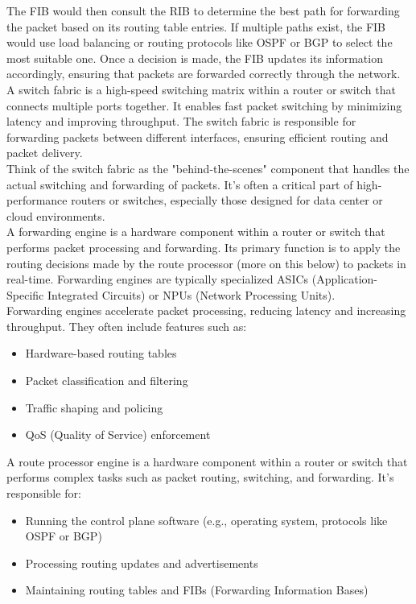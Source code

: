 \documentclass{article}
\begin{document}
The FIB would then consult the RIB to determine the best path for forwarding the packet based on its routing table entries. If multiple paths exist, the FIB would use load balancing or routing protocols like OSPF or BGP to select the most suitable one. Once a decision is made, the FIB updates its information accordingly, ensuring that packets are forwarded correctly through the network.\\

A switch fabric is a high-speed switching matrix within a router or switch that connects multiple ports together. It enables fast packet switching by minimizing latency and improving throughput. The switch fabric is responsible for forwarding packets between different interfaces, ensuring efficient routing and packet delivery.\\

Think of the switch fabric as the "behind-the-scenes" component that handles the actual switching and forwarding of packets. It's often a critical part of high-performance routers or switches, especially those designed for data center or cloud environments.\\

A forwarding engine is a hardware component within a router or switch that performs packet processing and forwarding. Its primary function is to apply the routing decisions made by the route processor (more on this below) to packets in real-time. Forwarding engines are typically specialized ASICs (Application-Specific Integrated Circuits) or NPUs (Network Processing Units).\\

Forwarding engines accelerate packet processing, reducing latency and increasing throughput. They often include features 
such as:
	\begin{itemize}
		\item Hardware-based routing tables 
		\item Packet classification and filtering 
		\item Traffic shaping and policing 
		\item QoS (Quality of Service) enforcement 
	\end{itemize}

A route processor engine is a hardware component within a router or switch that performs complex tasks such as packet routing, switching, and forwarding. It's responsible for:
	\begin{itemize}
		\item Running the control plane software (e.g., operating system, protocols like OSPF or BGP) 
		\item Processing routing updates and advertisements 
		\item Maintaining routing tables and FIBs (Forwarding Information Bases) 
	\end{itemize}
\end{document}
